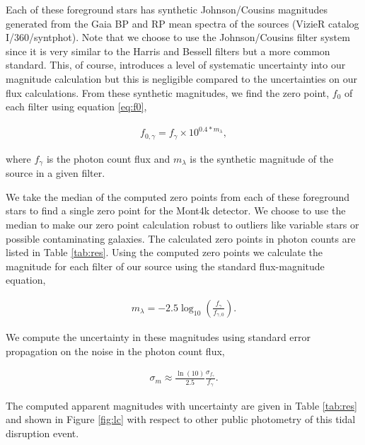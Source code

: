 \documentclass{aastex631}
\begin{document}
Each of these foreground stars has synthetic Johnson/Cousins magnitudes generated from the Gaia BP and RP mean spectra of the sources \citep{gaiadr3,gaiadr3_syntphot} (VizieR catalog I/360/syntphot). Note that we choose to use the Johnson/Cousins filter system since it is very similar to the Harris and Bessell filters but a more common standard. This, of course, introduces a level of systematic uncertainty into our magnitude calculation but this is negligible compared to the  uncertainties on our flux calculations. From these synthetic magnitudes, we find the zero point, $f_0$ of each filter using equation \ref{eq:f0},

\begin{align}
  f_{0,\gamma} = f_\gamma \times 10^{0.4 * m_\lambda},\label{eq:f0}
\end{align}

\noindent where $f_\gamma$ is the photon count flux and $m_\lambda$ is the synthetic magnitude of the source in a given filter.

\noindent We take the median of the computed zero points from each of these foreground stars to find a single zero point for the Mont4k detector. We choose to use the median to make our zero point calculation robust to outliers like variable stars or possible contaminating galaxies. The calculated zero points in photon counts are listed in Table \ref{tab:res}. Using the computed zero points we calculate the magnitude for each filter of our source using the standard flux-magnitude equation,

\begin{align}
  m_\lambda = -2.5\log_{10}\left(\frac{f_\gamma}{f_{\gamma,0}}\right).
\end{align}

\noindent We compute the uncertainty in these magnitudes using standard error propagation on the noise in the photon count flux,

\begin{align}
  \sigma_m \approx \frac{\ln(10)}{2.5} \frac{\sigma_{f_\gamma}}{f_\gamma} .
\end{align}

\noindent The computed apparent magnitudes with uncertainty are given in Table \ref{tab:res} and shown in Figure \ref{fig:lc} with respect to other public photometry of this tidal disruption event.
\end{document}
